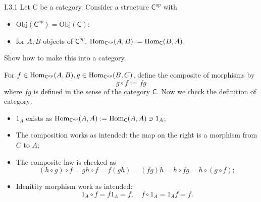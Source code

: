 \section{}
\begin{problem}{I.3.1}
Let \textsf{C} be a category. Consider a structure $\mathsf{C}^{op}$ with
\begin{itemize}
\setlength\itemsep{0pc}
\item $\text{Obj}(\mathsf{C}^{op}) = \text{Obj}(\mathsf{C})$;
\item for $A, B$ objects of $\mathsf{C}^{op}$, $\operatorname{Hom}_{\mathsf{C}^{op}}(A,B) := \operatorname{Hom}_\mathsf{C}(B,A)$.
\end{itemize}
Show how to make this into a category.
\end{problem}
\begin{sol}
For $f \in \operatorname{Hom}_{\mathsf{C}^{op}}(A,B), g \in \operatorname{Hom}_{\mathsf{C}^{op}}(B,C)$, define the composite of morphisms by
\[
g \circ f := fg     
\]
where $fg$ is defined in the sense of the category $\mathsf{C}$. Now we check the definition of category:
\begin{itemize}
\setlength\itemsep{0pt}
\item $1_A$ exists as $\operatorname{Hom}_{\mathsf{C}^{op}}(A,A) := \operatorname{Hom}_\mathsf{C}(A,A) \ni 1_A$; 
\item The composition works as intended: the map on the right is a morphism from $C$ to $A$;
\item The composite law is checked as
\[
(h \circ g) \circ f = gh \circ f = f(gh) = (fg)h = h \circ fg = h \circ (g \circ f);
\]
\item Idenitity morphism work as intended:
\[
1_A \circ f = f1_A = f, \quad f \circ 1_A = 1_Af = f.	
\]
\end{itemize}
\end{sol}

